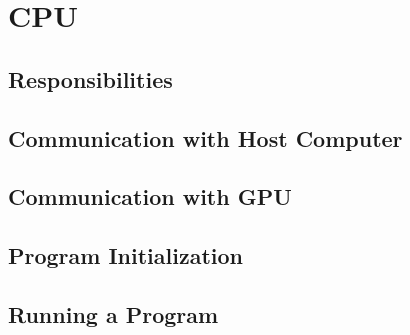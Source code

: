 \chapter{CPU}

\section{Responsibilities}

\section{Communication with Host Computer}

\section{Communication with GPU}

\section{Program Initialization}

\section{Running a Program}
